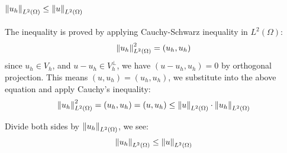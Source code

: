 \documentclass[12pt]{article} %
\newcommand{\1}[1]{\mathds{1}\left[#1\right]}
\begin{document}
\subsection{$\norm{{u_h}}_{L^2(\Omega)} \le \norm{{u}}_{L^2(\Omega)}$}
The inequality is proved by applying Cauchy-Schwarz inequality in $L^2(\Omega)$:
$$
	\norm{u_h}_{L^2(\Omega)}^2 = (u_h, u_h)
$$ since $u_h\in V_h$, and $u-u_h\in V_h^{\perp}$, we have $(u - u_h, u_h) = 0$ by orthogonal projection. This means $(u, u_h) = (u_h, u_h)$, we substitute into the above equation and apply Cauchy's inequality:
$$
	\norm{u_h}_{L^2(\Omega)}^2 = (u_h, u_h) = (u, u_h) \le \norm{u}_{L^2(\Omega)}\cdot\norm{u_h}_{L^2(\Omega)}
$$

Divide both sides by $\norm{u_h}_{L^2(\Omega)}$, we see:
$$
	\norm{u_h}_{L^2(\Omega)} \le \norm{u}_{L^2(\Omega)}
$$
\end{document}
